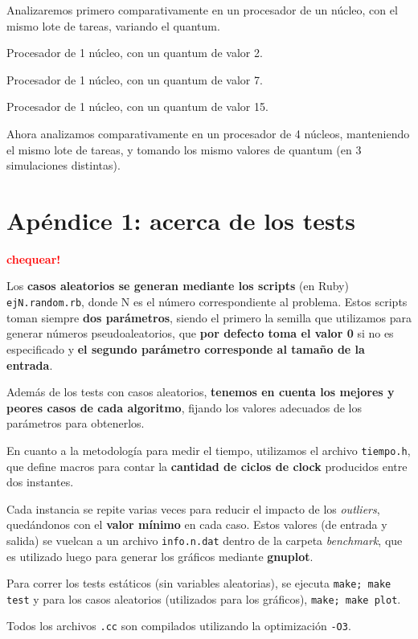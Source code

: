 \documentclass[a4paper]{article}
\begin{document}
Analizaremos primero comparativamente en un procesador de un núcleo, con el
mismo lote de tareas, variando el quantum.

Procesador de 1 núcleo, con un quantum de valor 2.

Procesador de 1 núcleo, con un quantum de valor 7.

Procesador de 1 núcleo, con un quantum de valor 15.

Ahora analizamos comparativamente en un procesador de 4 núcleos, manteniendo
el mismo lote de tareas, y tomando los mismo valores de quantum (en 3
simulaciones distintas).

\newpage

\section{Apéndice 1: acerca de los tests}

\textcolor{red}{\textbf{chequear!}} \medskip

Los \textbf{casos aleatorios se generan mediante los scripts} (en Ruby) \verb|ejN.random.rb|, donde
N es el número correspondiente al problema. Estos scripts toman siempre \textbf{dos parámetros},
siendo el primero la semilla que utilizamos para generar números pseudoaleatorios, que
\textbf{por defecto toma el valor 0} si no es especificado y \textbf{el segundo parámetro corresponde
al tamaño de la entrada}.

Además de los tests con casos aleatorios, \textbf{tenemos en cuenta los mejores y peores
casos de cada algoritmo}, fijando los valores adecuados de los parámetros para
obtenerlos. \medskip

En cuanto a la metodología para medir el tiempo, utilizamos el archivo \verb|tiempo.h|,
que define macros para contar la \textbf{cantidad de ciclos de clock} producidos entre dos instantes. \medskip

Cada instancia se repite varias veces para reducir el impacto de los \textit{outliers}, quedándonos
con el \textbf{valor mínimo} en cada caso. Estos valores (de entrada y salida) se vuelcan a un archivo
\verb|info.n.dat| dentro de la carpeta \textit{benchmark}, que es utilizado luego para generar los gráficos
mediante \textbf{gnuplot}. \medskip

Para correr los tests estáticos (sin variables aleatorias), se ejecuta \verb|make; make test| y para los
casos aleatorios (utilizados para los gráficos), \verb|make; make plot|.

Todos los archivos \verb|.cc| son compilados utilizando la optimización \verb|-O3|. \medskip
\end{document}
